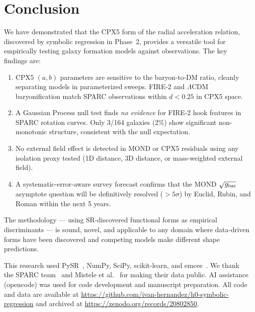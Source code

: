 \documentclass[twocolumn]{aastex631}
\begin{document}
\section{Conclusion}

We have demonstrated that the CPX5 form of the radial acceleration
relation, discovered by symbolic regression in Phase~2, provides a
versatile tool for empirically testing galaxy formation models against
observations.  The key findings are:

\begin{enumerate}
\item CPX5 $(a,b)$ parameters are sensitive to the baryon-to-DM ratio,
      cleanly separating models in parameterized sweeps.  FIRE-2 and
      $\Lambda$CDM baryonification match SPARC observations within
      $d < 0.25$ in CPX5 space.
\item A Gaussian Process null test finds \emph{no evidence} for FIRE-2
      hook features in SPARC rotation curves.  Only 3/164 galaxies (2\%)
      show significant non-monotonic structure, consistent with the null
      expectation.
\item No external field effect is detected in MOND or CPX5 residuals
      using any isolation proxy tested (1D distance, 3D distance, or
      mass-weighted external field).
\item A systematic-error-aware survey forecast confirms that the MOND
      $\sqrt{g_{\rm bar}}$ asymptote question will be definitively
      resolved ($>5\sigma$) by Euclid, Rubin, and Roman within the
      next 5 years.
\end{enumerate}

The methodology --- using SR-discovered functional forms as empirical
discriminants --- is sound, novel, and applicable to any domain where
data-driven forms have been discovered and competing models make
different shape predictions.

\begin{acknowledgments}
This research used PySR~\cite{pysr}, NumPy, SciPy, scikit-learn, and
emcee~\cite{emcee}.  We thank the SPARC team~\cite{lelli2016} and
Mistele et al.~\cite{mistele2024} for making their data public.
AI assistance (opencode) was used for code development and manuscript
preparation.  All code and data are available at
\url{https://github.com/ivan-hernandez/h0-symbolic-regression}
and archived at \url{https://zenodo.org/records/20802850}.
\end{acknowledgments}
\end{document}
